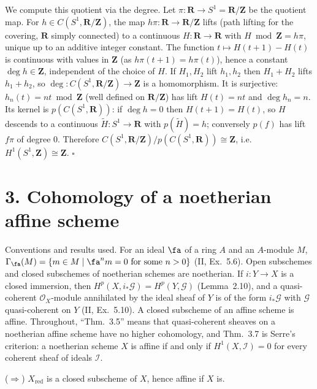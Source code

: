 \documentclass[11pt]{article}
\begin{document}
We compute this quotient via the degree. Let $\pi:\mathbf R\to S^1=\mathbf R/\mathbf Z$ be the quotient map. For $h\in C(S^1,\mathbf R/\mathbf Z)$, the map $h\pi:\mathbf R\to\mathbf R/\mathbf Z$ lifts (path lifting for the covering, $\mathbf R$ simply connected) to a continuous $H:\mathbf R\to\mathbf R$ with $H\bmod\mathbf Z=h\pi$, unique up to an additive integer constant. The function $t\mapsto H(t+1)-H(t)$ is continuous with values in $\mathbf Z$ (as $h\pi(t+1)=h\pi(t)$), hence a constant $\deg h\in\mathbf Z$, independent of the choice of $H$. If $H_1,H_2$ lift $h_1,h_2$ then $H_1+H_2$ lifts $h_1+h_2$, so $\deg:C(S^1,\mathbf R/\mathbf Z)\to\mathbf Z$ is a homomorphism. It is surjective: $h_n(t)=nt\bmod\mathbf Z$ (well defined on $\mathbf R/\mathbf Z$) has lift $H(t)=nt$ and $\deg h_n=n$. Its kernel is $p(C(S^1,\mathbf R))$: if $\deg h=0$ then $H(t+1)=H(t)$, so $H$ descends to a continuous $\tilde H:S^1\to\mathbf R$ with $p(\tilde H)=h$; conversely $p(f)$ has lift $f\pi$ of degree $0$. Therefore $C(S^1,\mathbf R/\mathbf Z)/p(C(S^1,\mathbf R))\cong\mathbf Z$, i.e.\ $H^1(S^1,\mathbf Z)\cong\mathbf Z$. \hfill$\square$

\section*{3. Cohomology of a noetherian affine scheme}

Conventions and results used. For an ideal $\fa$ of a ring $A$ and an $A$-module $M$, $\Gamma_{\fa}(M)=\{m\in M\mid \fa^nm=0\text{ for some }n>0\}$ (II, Ex.~5.6). Open subschemes and closed subschemes of noetherian schemes are noetherian. If $i:Y\to X$ is a closed immersion, then $H^p(X,i_*\mathcal G)=H^p(Y,\mathcal G)$ (Lemma~2.10), and a quasi-coherent $\mathcal O_X$-module annihilated by the ideal sheaf of $Y$ is of the form $i_*\mathcal G$ with $\mathcal G$ quasi-coherent on $Y$ (II, Ex.~5.10). A closed subscheme of an affine scheme is affine. Throughout, ``Thm.~3.5'' means that quasi-coherent sheaves on a noetherian affine scheme have no higher cohomology, and Thm.~3.7 is Serre's criterion: a noetherian scheme $X$ is affine if and only if $H^1(X,\mathcal I)=0$ for every coherent sheaf of ideals $\mathcal I$.

\pf
($\Rightarrow$) $X_{\mathrm{red}}$ is a closed subscheme of $X$, hence affine if $X$ is.
\end{document}

